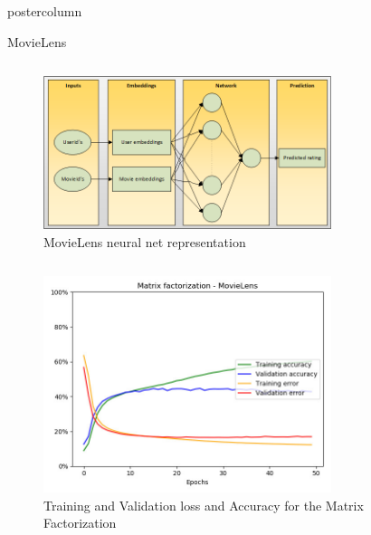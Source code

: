 \documentclass[final,hyperref={pdfpagelabels=false}]{beamer}
\begin{document}
\begin{frame}
\begin{columns}
\begin{column}{.49\paperwidth}
\begin{beamercolorbox}[center,wd=\textwidth]{postercolumn}
\begin{minipage}[T]{.99\textwidth}
{\begin{block}{MovieLens}
\begin{columns}
\begin{column}{1\textwidth}
\begin{minipage}[t]{0.96\textwidth}
 \begin{figure}

\includegraphics[width=0.75\textwidth]{movielensnet.png}
 \caption{MovieLens neural net representation} \label{fig:simple_cf_movielens}
\end{figure}  

\begin{columns}
 \begin{column}{0.49\textwidth}
	
	
\begin{figure}

\includegraphics[width=0.75\textwidth]{MatrixFactorization_MovieLens.jpg}
 \caption{Training and Validation loss and Accuracy for the Matrix Factorization} \label{fig:movielens_mf}
\end{figure}  


\end{column}
\end{columns}
\end{minipage}
\end{column}
\end{columns}
\end{block}}
\end{minipage}
\end{beamercolorbox}
\end{column}
\end{columns}
\end{frame}
\end{document}
